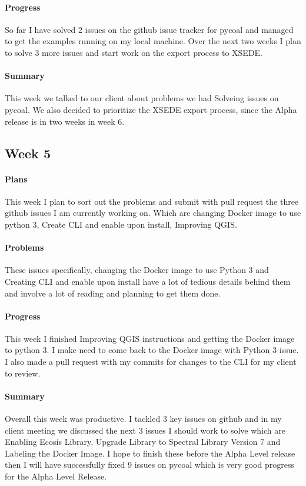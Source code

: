 \documentclass{article}
\begin{document}
\paragraph{Progress}
So far I have solved 2 issues on the github issue tracker for pycoal and managed to get the examples running on my local machine. Over the next two weeks I plan to solve 3 more issues and start work on the export process to XSEDE. 
\paragraph{Summary}
 This week we talked to our client about problems we had
Solveing issues on pycoal. We also decided to prioritize the
XSEDE export process, since the Alpha release is in two weeks in week 6.
\subsection{Week 5}
\paragraph{Plans}
This week I plan to sort out the problems and submit with pull request the three github issues I am currently working on. Which are changing Docker image to use python 3, Create CLI and enable upon install, Improving QGIS.
\paragraph{Problems}
These issues specifically, changing the Docker image to use Python 3 and Creating CLI and enable upon install have a lot of tedious details behind them and involve a lot of reading and planning to get them done. 
\paragraph{Progress}
This week I finished Improving QGIS instructions and getting the Docker image to python 3. I make need to come back to the Docker image with Python 3 issue. I also made a pull request with my commits for changes to the CLI for my client to review. 
\paragraph{Summary}
Overall this week was productive. I tackled 3 key issues on github and in my client meeting we discussed the next 3 issues I should work to solve which are Enabling Ecosis Library, Upgrade Library to Spectral Library Version 7 and Labeling the Docker Image. I hope to finish these before the Alpha Level release then I will have successfully fixed 9 issues on pycoal which is very good progress for the Alpha Level Release. 
\end{document}
